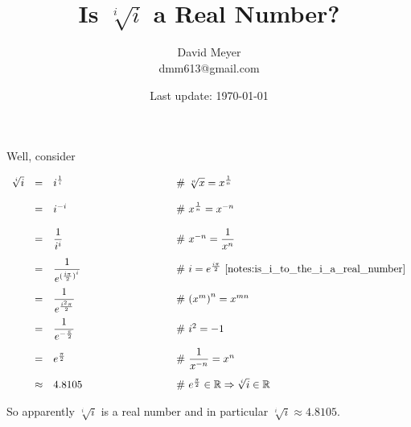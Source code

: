 \documentclass[11pt, oneside]{article}   	%
\begin{document}
\title {Is $\sqrt[i]{i}$ a Real Number?}
\author{David Meyer \\ dmm613@gmail.com}

\date{Last update: \today}							%
\maketitle

Well, consider

\begin{equation*}
\begin{array}{lllll}
\sqrt[i]{i}
&=& i^{\frac{1}{i}}			
		&\qquad \qquad \qquad \qquad \mathbin{\#} \text{ $\sqrt[n]{x} = x^{\frac{1}{n}}$} \\
[12pt]
&=& i^{-i}
		&\qquad \qquad \qquad \qquad \mathbin{\#} \text{ $x^{\frac{1}{n}} = x^{-n}$} \\
[12pt]
&=& \dfrac{1}{i^{i}}
		&\qquad \qquad \qquad \qquad \mathbin{\#} \text{ $x^{-n} = \dfrac{1}{x^{n}}$} \\
[12pt]
&=& \dfrac{1}{e^{{(\frac{i\pi}{2})}^i}}
		&\qquad \qquad \qquad \qquad \mathbin{\#} \text{ $i = e^{\frac{i \pi}{2}}$ 
		                                                 \cite{notes:is_i_to_the_i_a_real_number}} \\
[12pt]
&=& \dfrac{1}{e^{\frac{i^2\pi}{2}}}
		&\qquad \qquad \qquad \qquad \mathbin{\#} \text{ ${(x^m)}^n = x^{mn}$}  \\
[12pt]
&=& \dfrac{1}{e^{-\frac{\pi}{2}}}
		&\qquad \qquad \qquad \qquad \mathbin{\#} \text{ $i^2 = -1$} \\
[12pt]
&=& e^{\frac{\pi}{2}}
		&\qquad \qquad \qquad \qquad \mathbin{\#} \text{ $\dfrac{1}{x^{-n}} = x^{n}$} \\
[12pt]
&\approx& 4.8105
		&\qquad \qquad \qquad \qquad \mathbin{\#} \text{ $e^{\frac{\pi}{2}} \in \mathbb{R} 
														 \Rightarrow \sqrt[i]{i} \in \mathbb{R}$}
\end{array}
\end{equation*}

\bigskip
\noindent
So apparently $\sqrt[i]{i}$ is a real number and in particular $\sqrt[i]{i} \approx 4.8105$.
%
%
%
%
%
%
%
%


%
%
\end{document}
